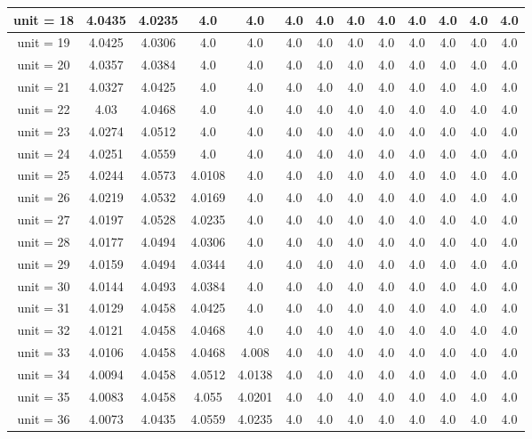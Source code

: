 \begin{table*}[ht]
\begin{tabular}{|c|c|c|c|c|c|c|c|c|c|c|c|c|}
\hline
unit = 18 &
4.0435 & 4.0235 & 4.0 & 4.0 & 4.0 & 4.0 & 4.0 & 4.0 & 4.0 & 4.0 & 4.0 & 4.0 \\
\hline
unit = 19 &
4.0425 & 4.0306 & 4.0 & 4.0 & 4.0 & 4.0 & 4.0 & 4.0 & 4.0 & 4.0 & 4.0 & 4.0 \\
\hline
unit = 20 &
4.0357 & 4.0384 & 4.0 & 4.0 & 4.0 & 4.0 & 4.0 & 4.0 & 4.0 & 4.0 & 4.0 & 4.0 \\
\hline
unit = 21 &
4.0327 & 4.0425 & 4.0 & 4.0 & 4.0 & 4.0 & 4.0 & 4.0 & 4.0 & 4.0 & 4.0 & 4.0 \\
\hline
unit = 22 &
4.03 & 4.0468 & 4.0 & 4.0 & 4.0 & 4.0 & 4.0 & 4.0 & 4.0 & 4.0 & 4.0 & 4.0 \\
\hline
unit = 23 &
4.0274 & 4.0512 & 4.0 & 4.0 & 4.0 & 4.0 & 4.0 & 4.0 & 4.0 & 4.0 & 4.0 & 4.0 \\
\hline
unit = 24 &
4.0251 & 4.0559 & 4.0 & 4.0 & 4.0 & 4.0 & 4.0 & 4.0 & 4.0 & 4.0 & 4.0 & 4.0 \\
\hline
unit = 25 &
4.0244 & 4.0573 & 4.0108 & 4.0 & 4.0 & 4.0 & 4.0 & 4.0 & 4.0 & 4.0 & 4.0 & 4.0 \\
\hline
unit = 26 &
4.0219 & 4.0532 & 4.0169 & 4.0 & 4.0 & 4.0 & 4.0 & 4.0 & 4.0 & 4.0 & 4.0 & 4.0 \\
\hline
unit = 27 &
4.0197 & 4.0528 & 4.0235 & 4.0 & 4.0 & 4.0 & 4.0 & 4.0 & 4.0 & 4.0 & 4.0 & 4.0 \\
\hline
unit = 28 &
4.0177 & 4.0494 & 4.0306 & 4.0 & 4.0 & 4.0 & 4.0 & 4.0 & 4.0 & 4.0 & 4.0 & 4.0 \\
\hline
unit = 29 &
4.0159 & 4.0494 & 4.0344 & 4.0 & 4.0 & 4.0 & 4.0 & 4.0 & 4.0 & 4.0 & 4.0 & 4.0 \\
\hline
unit = 30 &
4.0144 & 4.0493 & 4.0384 & 4.0 & 4.0 & 4.0 & 4.0 & 4.0 & 4.0 & 4.0 & 4.0 & 4.0 \\
\hline
unit = 31 &
4.0129 & 4.0458 & 4.0425 & 4.0 & 4.0 & 4.0 & 4.0 & 4.0 & 4.0 & 4.0 & 4.0 & 4.0 \\
\hline
unit = 32 &
4.0121 & 4.0458 & 4.0468 & 4.0 & 4.0 & 4.0 & 4.0 & 4.0 & 4.0 & 4.0 & 4.0 & 4.0 \\
\hline
unit = 33 &
4.0106 & 4.0458 & 4.0468 & 4.008 & 4.0 & 4.0 & 4.0 & 4.0 & 4.0 & 4.0 & 4.0 & 4.0 \\
\hline
unit = 34 &
4.0094 & 4.0458 & 4.0512 & 4.0138 & 4.0 & 4.0 & 4.0 & 4.0 & 4.0 & 4.0 & 4.0 & 4.0 \\
\hline
unit = 35 &
4.0083 & 4.0458 & 4.055 & 4.0201 & 4.0 & 4.0 & 4.0 & 4.0 & 4.0 & 4.0 & 4.0 & 4.0 \\
\hline
unit = 36 &
4.0073 & 4.0435 & 4.0559 & 4.0235 & 4.0 & 4.0 & 4.0 & 4.0 & 4.0 & 4.0 & 4.0 & 4.0 \\

\end{tabular}
\end{table*}
